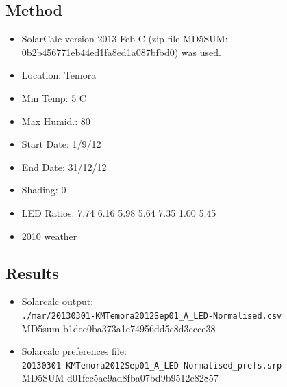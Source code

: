 \documentclass[12pt,a4paper]{book}
\begin{document}
    \subsection*{Method}
      \begin{itemize} \itemsep1pt \parskip0pt 
        \item SolarCalc version 2013 Feb C (zip file MD5SUM: 0b2b456771eb44ed1fa8ed1a087bfbd0) was
          used.
        \item Location: Temora
        \item Min Temp: 5 C
        \item Max Humid.: 80
        \item Start Date: 1/9/12
        \item End Date: 31/12/12
        \item Shading: 0
        \item LED Ratios: 7.74 6.16 5.98 5.64 7.35 1.00 5.45
        \item 2010 weather
      \end{itemize}
    \subsection*{Results}
      \begin{itemize} \itemsep1pt \parskip0pt 
        \item Solarcalc output:\\
          \verb+./mar/20130301-KMTemora2012Sep01_A_LED-Normalised.csv+ \\
          MD5sum b1dee0ba373a1e74956dd5c8d3ccce38
        \item Solarcalc preferences file:\\
          \verb+20130301-KMTemora2012Sep01_A_LED-Normalised_prefs.srp+ \\
          MD5SUM d01fcc5ae9ad8fba07bd9b9512c82857
      \end{itemize}
\end{document}
